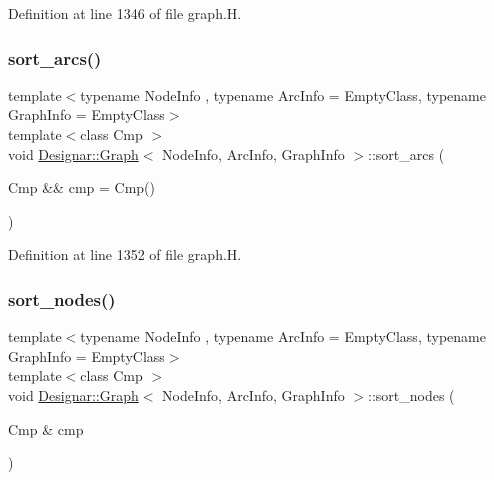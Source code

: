 Definition at line 1346 of file graph.\+H.

\mbox{\label{class_designar_1_1_graph_a37b5e36c96bf9efe44a0d6b83feb9656}} 
\subsubsection{\texorpdfstring{sort\+\_\+arcs()}{sort\_arcs()}\hspace{0.1cm}{\footnotesize\ttfamily [2/2]}}
{\footnotesize\ttfamily template$<$typename Node\+Info , typename Arc\+Info  = Empty\+Class, typename Graph\+Info  = Empty\+Class$>$ \\
template$<$class Cmp $>$ \\
void \hyperlink{class_designar_1_1_graph}{Designar\+::\+Graph}$<$ Node\+Info, Arc\+Info, Graph\+Info $>$\+::sort\+\_\+arcs (\begin{DoxyParamCaption}\item[{Cmp \&\&}]{cmp = {\ttfamily Cmp()} }\end{DoxyParamCaption})\hspace{0.3cm}{\ttfamily [inline]}}



Definition at line 1352 of file graph.\+H.

\mbox{\label{class_designar_1_1_graph_afcdce423516a879b23ec1b0fed201f20}} 
\subsubsection{\texorpdfstring{sort\+\_\+nodes()}{sort\_nodes()}\hspace{0.1cm}{\footnotesize\ttfamily [1/2]}}
{\footnotesize\ttfamily template$<$typename Node\+Info , typename Arc\+Info  = Empty\+Class, typename Graph\+Info  = Empty\+Class$>$ \\
template$<$class Cmp $>$ \\
void \hyperlink{class_designar_1_1_graph}{Designar\+::\+Graph}$<$ Node\+Info, Arc\+Info, Graph\+Info $>$\+::sort\+\_\+nodes (\begin{DoxyParamCaption}\item[{Cmp \&}]{cmp }\end{DoxyParamCaption})\hspace{0.3cm}{\ttfamily [inline]}}




